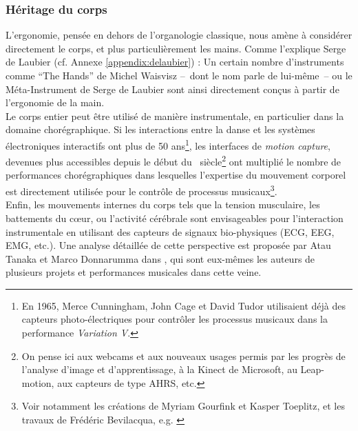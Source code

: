 \subsubsection{Héritage du corps}

\noindent L'ergonomie, pensée en dehors de l'organologie classique, nous amène à considérer directement le corps, et plus particulièrement les mains. Comme l'explique Serge de Laubier (cf. Annexe \ref{appendix:delaubier}) :  Un certain nombre d'instruments comme ``The Hands'' de Michel Waisvisz --~dont le nom parle de lui-même~-- ou le Méta-Instrument de Serge de Laubier sont ainsi directement conçus à partir de l'ergonomie de la main.\\
\indent Le corps entier peut être utilisé de manière instrumentale, en particulier dans la domaine chorégraphique. Si les interactions entre la danse et les systèmes électroniques interactifs ont plus de 50 ans\footnote{En 1965, Merce Cunningham, John Cage et David Tudor utilisaient déjà des capteurs photo-électriques pour contrôler les processus musicaux dans la performance \textit{Variation V}.}, les interfaces de \textit{motion capture}, devenues plus accessibles depuis le début du ~siècle\footnote{On pense ici aux webcams et aux nouveaux usages permis par les progrès de l'analyse d'image et d'apprentissage, à la Kinect de Microsoft, au Leap-motion, aux capteurs de type \gls{AHRS}, etc.} ont multiplié le nombre de performances chorégraphiques dans lesquelles l'expertise du mouvement corporel est directement utilisée pour le contrôle de processus musicaux\footnote{Voir notamment les créations de Myriam Gourfink et Kasper Toeplitz, et les travaux de Frédéric Bevilacqua, e.g. \cite{bevilacqua_gesture_2011}}.\\
\indent Enfin, les mouvements internes du corps tels que la tension musculaire, les battements du cœur, ou l'activité cérébrale sont envisageables pour l'interaction instrumentale en utilisant des capteurs de signaux bio-physiques (ECG, EEG, EMG, etc.). Une analyse détaillée de cette perspective est proposée par Atau Tanaka et Marco Donnarumma dans \cite{tanaka_body_2019}, qui sont eux-mêmes les auteurs de plusieurs projets et performances musicales dans cette veine.

